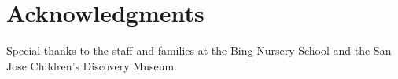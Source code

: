 \documentclass[10pt,letterpaper]{article}
\begin{document}
\section{Acknowledgments}

Special thanks to the staff and families at the Bing Nursery School and the San Jose Children's Discovery Museum.



\setlength{\bibleftmargin}{.125in} \setlength{\bibindent}{-\bibleftmargin}


\end{document}
